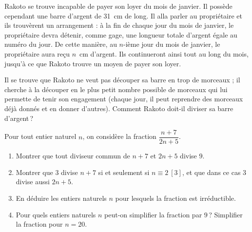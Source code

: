 \begin{exo}\label{exo:arith-32}
		Rakoto se trouve incapable de payer son loyer du mois de janvier.
		Il poss\`ede cependant une barre d'argent de 31~cm de long.
		Il alla parler au propri\'etaire et ils trouv\`erent un arrangement :
		\`a la fin de chaque jour du mois de janvier, le propri\'etaire devra d\'etenir, comme gage,
		une longueur totale d'argent \'egale au num\'ero du jour.
	De cette mani\`ere, au $n$-ième jour du mois de janvier, le propri\'etaire aura re\c{c}u $n$~cm d'argent.
		Ils continueront ainsi tout au long du mois, jusqu'\`a ce que Rakoto trouve un moyen de payer son loyer.
	
		Il se trouve que Rakoto ne veut pas d\'ecouper sa barre en trop de morceaux ;
	il cherche \`a la d\'ecouper en le plus petit nombre possible de morceaux qui lui permette de tenir son engagement
	(chaque jour, il peut reprendre des morceaux d\'ej\`a donn\'es et en donner d'autres).
		Comment Rakoto doit-il diviser sa barre d'argent\,?
%	
\end{exo}

\begin{exo}\label{exo:arith-33}
      Pour tout entier naturel $n$, on consid\`ere la fraction $\dfrac{n+7}{2n+5}$.
      \begin{enumerate}
            \item Montrer que tout diviseur commun de $n+7$ et $2n+5$ divise $9$.
            \item Montrer que $3$ divise $n + 7$ si et seulement si $n \equiv 2 \ [3]$, et que dans ce cas $3$ divise aussi $2n+5$.
            \item En d\'eduire les entiers naturels $n$ pour lesquels la fraction est irr\'eductible.
            \item Pour quels entiers naturels $n$ peut-on simplifier la fraction par $9$\,?
                  Simplifier la fraction pour $n = 20$.
      \end{enumerate}
\end{exo}

